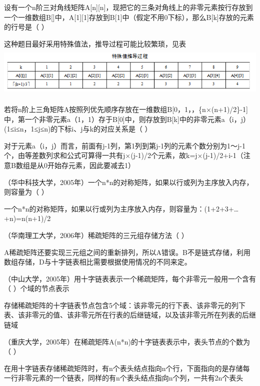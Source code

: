 \question 设有一个n阶三对角线矩阵A{[}n{]}{[}n{]}，现把它的三条对角线上的非零元素按行存放到一个一维数组B{[}{]}中，A{[}1{]}{[}1{]}存放到B{[}1{]}中（假定不用0下标），那么B{[}k{]}存放的元素的行号是（
）
\par{}
\begin{solution}这种题目最好采用特殊值法，推导过程可能比较繁琐，见表
\includegraphics[width=6.28125in,height=0.96875in]{computerassets/ecd0148ec7917beabeba93b448a52f92.png}
\end{solution}
\question 若将n阶上三角矩阵A按照列优先顺序存放在一维数组B{[}0，1，，\{n×(n+1)/2\}-1{]}中，第一个非零元素a（1，1）存于B{[}0{]}中，则存放到B{[}k{]}中的非零元素a（i，j）(1≤i≤n，1≤j≤n)的下标i、j与k的对应关系是（
）
\par{}
\begin{solution}对于元素a（i，j）而言，前面有j-1列，第1列到第j-1列的元素个数分别为1～j-1个，由等差数列求和公式可算得一共有j×(j-1)/2个元素，故k=j×(j-1)/2+i-1（注意B数组是从0开始存元素，因此要减去1）
\end{solution}
\question （华中科技大学，2005年）一个n*n的对称矩阵，如果以行或列为主序放入内存，则容量为（
）
\par{}
\begin{solution}一个n*n的对称矩阵，如果以行或列为主序放入内存，则容量为：(1+2+3+\ldots{}+n)=n(n+1)/2
\end{solution}
\question （华南理工大学，2006年）稀疏矩阵的三元组存储方法（ ）
\par{}
\begin{solution}A稀疏矩阵还要实现三元组之间的重新排列，所以A错误。B不是链式存储，利用数组存储，D与十字链表相比需要根据使用情况的不同来定。
\end{solution}
\question （中山大学，2005年）用十字链表表示一个稀疏矩阵，每个非零元一般用一个含有（
）个域的节点表示
\par{}
\begin{solution}存储稀疏矩阵的十字链表节点包含5个域：该非零元的行下表、该非零元的列下表、该非零元的值、该非零元所在行表的后继链域，以及该非零元所在列表的后继链域
\end{solution}
\question （重庆大学，2005年）在稀疏矩阵A(n*n)的十字链表表示中，表头节点的个数为（
）
\par{}
\begin{solution}在用十字链表存储稀疏矩阵时，有n个表头结点指向n个行，下面指向的是存储每一行非零元素的一个链表，同样的有n个表头结点指向n个列，一共有2n个表头
\end{solution}
